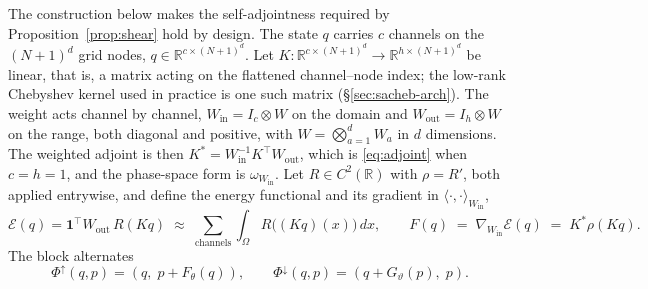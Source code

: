 \documentclass[11pt]{article}
\theoremstyle{definition}
\theoremstyle{remark}
\newcommand{\R}{\mathbb{R}}
\newcommand{\iprod}[2]{\langle #1, #2 \rangle}
\begin{document}
The construction below makes the self-adjointness required by
Proposition~\ref{prop:shear} hold by design. The state $q$ carries $c$ channels
on the $(N+1)^d$ grid nodes, $q\in\R^{c\times(N+1)^d}$. Let
$K:\R^{c\times(N+1)^d}\to\R^{h\times(N+1)^d}$ be linear, that is, a matrix
acting on the flattened channel--node index; the low-rank Chebyshev kernel used
in practice is one such matrix (\S\ref{sec:sacheb-arch}). The weight acts
channel by channel, $W_{\mathrm{in}}=I_c\otimes W$ on the domain and
$W_{\mathrm{out}}=I_h\otimes W$ on the range, both diagonal and positive, with
$W=\bigotimes_{a=1}^{d}W_a$ in $d$ dimensions. The weighted adjoint is then
$K^{*}=W_{\mathrm{in}}^{-1}K^{\top}W_{\mathrm{out}}$, which is
\eqref{eq:adjoint} when $c=h=1$, and the phase-space form is
$\omega_{W_{\mathrm{in}}}$. Let $R\in C^2(\R)$ with $\rho=R'$, both applied
entrywise, and define the energy functional and its gradient in
$\iprod{\cdot}{\cdot}_{W_{\mathrm{in}}}$,
\begin{equation}
\mathcal{E}(q)=\mathbf{1}^{\top}W_{\mathrm{out}}\,R(Kq)
\;\approx\;\sum_{\text{channels}}\int_\Omega R\big((Kq)(x)\big)\,dx,
\qquad
F(q) \;=\; \nabla_{W_{\mathrm{in}}}\mathcal{E}(q) \;=\; K^{*}\rho(Kq).
\label{eq:field}
\end{equation}
The block alternates
\begin{equation}
\Phi^{\uparrow}(q,p)=(q,\;p+F_\theta(q)),
\qquad
\Phi^{\downarrow}(q,p)=(q+G_\vartheta(p),\;p).
\label{eq:block}
\end{equation}
\end{document}
